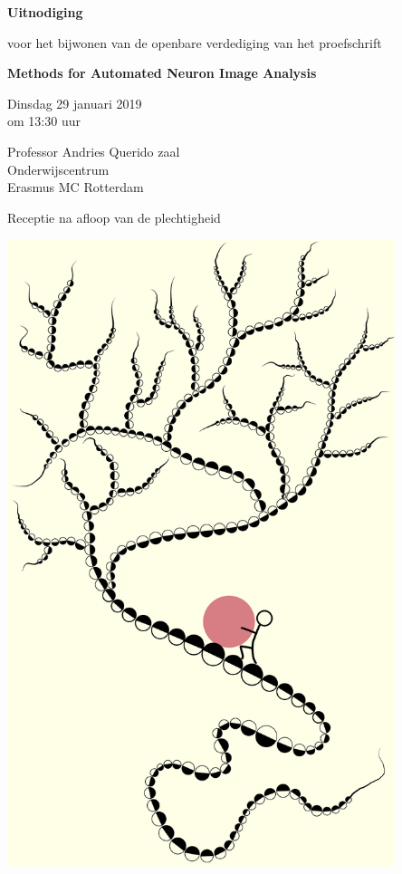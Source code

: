 \documentclass[10pt]{report}
\begin{document}
\pagestyle{empty}
\setlength{\leftmargini}{0em}

\begin{center}
	
  	{\Large\bf Uitnodiging}

  	\bigskip

  	voor het bijwonen van de openbare verdediging van het proefschrift

  	\bigskip
  	\bigskip
	
  	{\Large\bf  Methods for Automated Neuron Image Analysis}%

  	\bigskip
  	\bigskip
  
  	Dinsdag 29 januari 2019\\om 13:30 uur
  
  	\bigskip
  	\bigskip
  
  	Professor Andries Querido zaal\\
  	Onderwijscentrum\\%
  	Erasmus MC Rotterdam
  
  	\bigskip
  	\bigskip
  
 	Receptie na afloop van de plechtigheid
  
 	\bigskip

	\includegraphics[width=0.85\textwidth]{syziphus}


\end{center}
\end{document}
